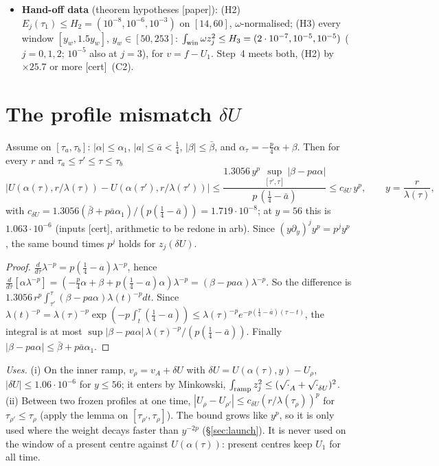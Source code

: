 \documentclass[11pt]{article}
\theoremstyle{remark}\newtheorem{remark}[theorem]{Remark}
\newcommand{\tC}{\textup{[cert]}}\newcommand{\tE}{\textup{[est]}}\newcommand{\tP}{\textup{[paper]}}
\begin{document}
\begin{itemize}[leftmargin=*,itemsep=2pt]
\item \textbf{Hand-off data} (theorem hypotheses \tP): (H2) $E_j(\tau_1)\le H_2=(10^{-8},10^{-6},10^{-3})$ on $[14,60]$, $\omega$-normalised; (H3) every window $[y_w,1.5y_w]$, $y_w\in[50,253]$: $\int_{\rm win}\omega z_j^2\le H_3=(2\cdot10^{-7},10^{-5},10^{-5})$ ($j=0,1,2$; $10^{-5}$ also at $j=3$), for $v=f-U_1$. Step~4 meets both, (H2) by $\times25.7$ or more \tC\ (C2).
\end{itemize}

\section{The profile mismatch $\delta U$}\label{sec:dU}
\begin{lemma}\label{lem:dU}
Assume on $[\tau_a,\tau_b]$: $|\alpha|\le\alpha_1$, $|a|\le\bar a<\frac14$, $|\beta|\le\bar\beta$, and $\alpha_\tau=-\frac p4\alpha+\beta$. Then for every $r$ and $\tau_a\le\tau'\le\tau\le\tau_b$
\[
\bigl|U(\alpha(\tau),r/\lambda(\tau))-U(\alpha(\tau'),r/\lambda(\tau'))\bigr|\le\frac{1.3056\,y^p\,\sup_{[\tau',\tau]}|\beta-pa\alpha|}{p\,(\frac14-\bar a)}\le c_{\delta U}\,y^p,\qquad y=\frac r{\lambda(\tau)},
\]
with $c_{\delta U}=1.3056(\bar\beta+p\bar a\alpha_1)/(p(\frac14-\bar a))=1.719\cdot10^{-8}$; at $y=56$ this is $1.063\cdot10^{-6}$ (inputs \tC, arithmetic to be redone in arb). Since $(y\partial_y)^jy^p=p^jy^p$, the same bound times $p^j$ holds for $z_j(\delta U)$.
\end{lemma}
\begin{proof}
$\frac{d}{d\tau}\lambda^{-p}=p(\frac14-a)\lambda^{-p}$, hence $\frac{d}{d\tau}[\alpha\lambda^{-p}]=(-\frac p4\alpha+\beta+p(\frac14-a)\alpha)\lambda^{-p}=(\beta-pa\alpha)\lambda^{-p}$. So the difference is $1.3056\,r^p\int_{\tau'}^{\tau}(\beta-pa\alpha)\lambda(t)^{-p}dt$. Since $\lambda(t)^{-p}=\lambda(\tau)^{-p}\exp(-p\int_t^\tau(\frac14-a))\le\lambda(\tau)^{-p}e^{-p(\frac14-\bar a)(\tau-t)}$, the integral is at most $\sup|\beta-pa\alpha|\,\lambda(\tau)^{-p}/(p(\frac14-\bar a))$. Finally $|\beta-pa\alpha|\le\bar\beta+p\bar a\alpha_1$.
\end{proof}
\noindent\emph{Uses.} (i) On the inner ramp, $v_\rho=v_A+\delta U$ with $\delta U=U(\alpha(\tau),y)-U_\rho$, $|\delta U|\le1.06\cdot10^{-6}$ for $y\le56$; it enters by Minkowski, $\int_{\rm ramp}z_j^2\le(\sqrt{\cdot}_A+\sqrt{\cdot}_{\delta U})^2$. (ii) Between two frozen profiles at one time, $|U_\rho-U_{\rho'}|\le c_{\delta U}(r/\lambda(\tau_\rho))^p$ for $\tau_{\rho'}\le\tau_\rho$ (apply the lemma on $[\tau_{\rho'},\tau_\rho]$). The bound grows like $y^p$, so it is only used where the weight decays faster than $y^{-2p}$ (\S\ref{sec:launch}). It is never used on the window of a present centre against $U(\alpha(\tau))$: present centres keep $U_1$ for all time.
\end{document}
